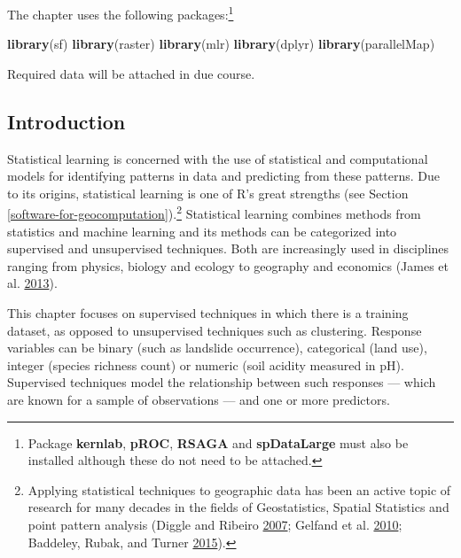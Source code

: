\documentclass[]{krantz}
\newenvironment{Shaded}{\begin{snugshade}}{\end{snugshade}}
\newcommand{\KeywordTok}[1]{\textcolor[rgb]{0.27,0.27,0.27}{\textbf{#1}}}
\newcommand{\NormalTok}[1]{#1}
\let\rmarkdownfootnote\footnote%
\def\footnote{\protect\rmarkdownfootnote}
\begin{document}
The chapter uses the following packages:\footnote{Package \textbf{kernlab}, \textbf{pROC}, \textbf{RSAGA} and \textbf{spDataLarge} must also be installed although these do not need to be attached.}

\begin{Shaded}
\begin{Highlighting}[]
\KeywordTok{library}\NormalTok{(sf)}
\KeywordTok{library}\NormalTok{(raster)}
\KeywordTok{library}\NormalTok{(mlr)}
\KeywordTok{library}\NormalTok{(dplyr)}
\KeywordTok{library}\NormalTok{(parallelMap)}
\end{Highlighting}
\end{Shaded}

Required data will be attached in due course.

\hypertarget{intro-cv1}{%
\subsection{Introduction}\label{intro-cv1}}

Statistical learning is concerned with the use of statistical and computational models for identifying patterns in data and predicting from these patterns.
Due to its origins, statistical learning is one of R's great strengths (see Section \ref{software-for-geocomputation}).\footnote{Applying statistical techniques to geographic data has been an active topic of research for many decades in the fields of Geostatistics, Spatial Statistics and point pattern analysis (Diggle and Ribeiro \protect\hyperlink{ref-diggle_modelbased_2007}{2007}; Gelfand et al. \protect\hyperlink{ref-gelfand_handbook_2010}{2010}; Baddeley, Rubak, and Turner \protect\hyperlink{ref-baddeley_spatial_2015}{2015}).}
Statistical learning combines methods from statistics and machine learning and its methods can be categorized into supervised and unsupervised techniques.
Both are increasingly used in disciplines ranging from physics, biology and ecology to geography and economics (James et al. \protect\hyperlink{ref-james_introduction_2013}{2013}).

This chapter focuses on supervised techniques in which there is a training dataset, as opposed to unsupervised techniques such as clustering.
Response variables can be binary (such as landslide occurrence), categorical (land use), integer (species richness count) or numeric (soil acidity measured in pH).
Supervised techniques model the relationship between such responses --- which are known for a sample of observations --- and one or more predictors.
\end{document}
